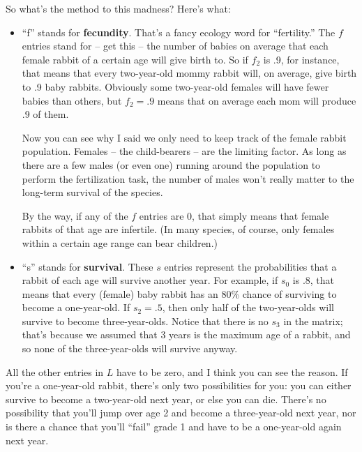 \medskip
So what's the method to this madness? Here's what:


\begin{itemize}
\itemsep.1em


\item ``f'' stands for \textbf{fecundity}. That's a fancy ecology word for
``fertility.'' The $f$ entries stand for -- get this -- the number of babies on
average that each female rabbit of a certain age will give birth to. So if
$f_2$ is .9, for instance, that means that every two-year-old mommy rabbit
will, on average, give birth to .9 baby rabbits. Obviously some two-year-old
females will have fewer babies than others, but $f_2=.9$ means that on average
each mom will produce .9 of them.

Now you can see why I said we only need to keep track of the female rabbit
population. Females -- the child-bearers -- are the limiting factor. As long as
there are a few males (or even one) running around the population to perform
the fertilization task, the number of males won't really matter to the
long-term survival of the species.

By the way, if any of the $f$ entries are 0, that simply means that female
rabbits of that age are infertile. (In many species, of course, only females
within a certain age range can bear children.)


\item ``s'' stands for \textbf{survival}. These $s$ entries represent the
probabilities that a rabbit of each age will survive another year. For example,
if $s_0$ is .8, that means that every (female) baby rabbit has an 80\% chance
of surviving to become a one-year-old. If $s_2=.5$, then only half of the
two-year-olds will survive to become three-year-olds. Notice that there is no
$s_3$ in the matrix; that's because we assumed that 3 years is the maximum age
of a rabbit, and so none of the three-year-olds will survive anyway.

\end{itemize}

All the other entries in $L$ have to be zero, and I think you can see the
reason. If you're a one-year-old rabbit, there's only two possibilities for
you: you can either survive to become a two-year-old next year, or else you can
die. There's no possibility that you'll jump over age 2 and become a
three-year-old next year, nor is there a chance that you'll ``fail'' grade 1
and have to be a one-year-old again next year.


